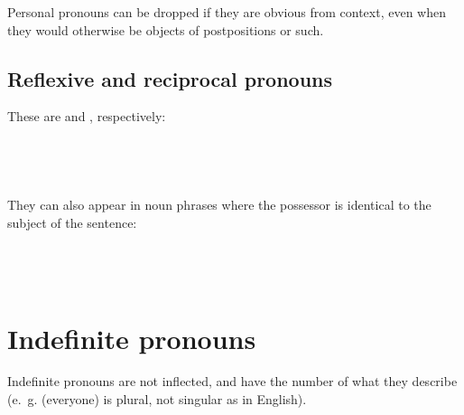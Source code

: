 \documentclass{book}
\begin{document}
Personal pronouns can be dropped if they are obvious from context, even when they would otherwise be objects of postpositions or such.

\subsection{Reflexive and reciprocal pronouns}

These are  and , respectively: \\
~\\
     \\
     \\
     \\

They can also appear in noun phrases where the possessor is identical to the subject of the sentence: \\
~\\
     \\
     \\
   

\section{Indefinite pronouns}

Indefinite pronouns are not inflected, and have the number of what they describe (e.~g.  (everyone) is plural, not singular as in English).
\end{document}
